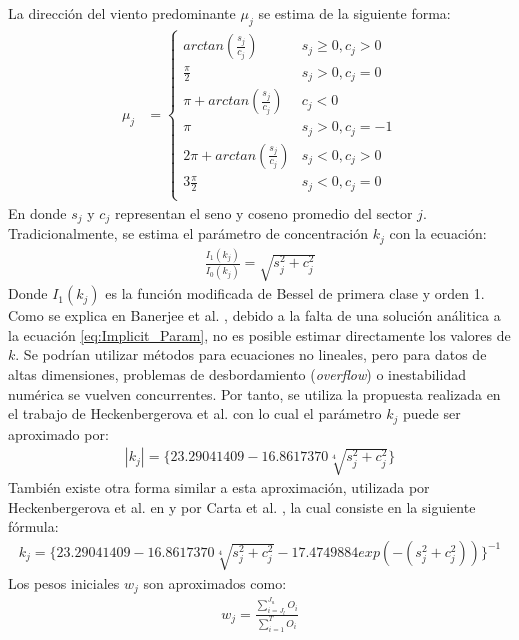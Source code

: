 La dirección del viento predominante $\mu_j$ se estima de la siguiente forma:
\begin{align}\label{eq:Prevailing_Param}
    \mu_j &= 
        \left\{
            \begin{array}{ll}
                arctan(\frac{s_j}{c_j})  & s_j \geq 0, c_j > 0\\
                \frac{\pi}{2} & s_j > 0, c_j = 0\\
                \pi + arctan(\frac{s_j}{c_j}) & c_j < 0\\
                \pi & s_j > 0, c_j = -1\\
                2\pi + arctan(\frac{s_j}{c_j}) & s_j < 0, c_j > 0\\
                3\frac{\pi}{2} & s_j < 0, c_j = 0\\
            \end{array}
        \right.
\end{align}
En donde $s_j$ y $c_j$ representan el seno y coseno promedio del sector $j$.\\
Tradicionalmente, se estima el parámetro de concentración $k_j$ con la ecuación:
\begin{align}\label{eq:Implicit_Param}
    \frac{I_1(k_j)}{I_0(k_j)} = \sqrt{s_j^2 + c_j^2}
\end{align}
Donde $I_1(k_j)$ es la función modificada de Bessel de primera clase y orden 1.
 Como se explica en Banerjee et al. \cite{Banerjee05}, debido a la falta de una solución análitica a la ecuación \ref{eq:Implicit_Param}, no es posible estimar directamente los valores de $k$. Se podrían utilizar métodos para ecuaciones no lineales, pero para datos de altas dimensiones, problemas de desbordamiento (\emph{overflow}) o inestabilidad numérica se vuelven concurrentes. Por tanto, se utiliza la propuesta realizada en el trabajo de Heckenbergerova et al. \cite{Heckenbergerova15} con lo cual el parámetro $k_j$ puede ser aproximado por:\\
\begin{align}
    |k_j| = \{23.29041409 - 16.8617370\sqrt[4]{s_j^2 + c_j^2}\} 
\end{align}
También existe otra forma similar a esta aproximación, utilizada por  Heckenbergerova et al. en \cite{Heckenbergerova13} y por Carta et al. \cite{Carta07}, la cual consiste en 
la siguiente fórmula:\\
\begin{align}
    k_j = \{23.29041409 - 16.8617370\sqrt[4]{s_j^2 + c_j^2} - 17.4749884 exp(-(s_j^2 + c_j^2))\}^{-1} 
\end{align}
Los pesos iniciales $w_j$ son aproximados como: \\
\begin{align}\label{eq:Weight_Param}
    w_j = \frac{\sum_{i=J_l}^{J_u} O_i}{\sum_{i=1}^{T} O_i}
\end{align}

